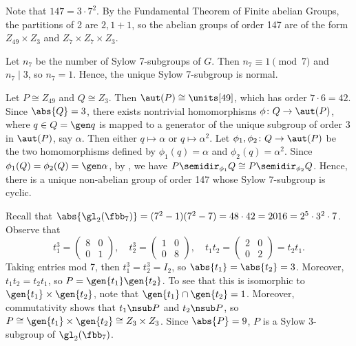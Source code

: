 \begin{solenum}
    \item Note that $147 = 3 \cdot 7^2$.
	By the Fundamental Theorem of Finite abelian Groups, the partitions of 2 are $2, 1 + 1$, so the abelian groups of order 147 are of the form $Z_{49} \times Z_3$ and $Z_7 \times Z_7 \times Z_3$.
    \item Let $n_7$ be the number of Sylow 7-subgroups of $G$.
	Then $n_7 \equiv 1 \pmod 7$ and $n_7 \mid 3$, so $n_7 = 1$.
	Hence, the unique Sylow 7-subgroup is normal.
    \item Let $P \cong Z_{49}$ and $Q \cong Z_3$.
	Then $\aut(P) \cong \units[49]$, which has order $7 \cdot 6 = 42$.
	Since $\abs{Q} = 3$, there exists nontrivial homomorphisms $\phi \colon Q \to \aut(P)$, where $q \in Q = \gen q$ is mapped to a generator of the unique subgroup of order 3 in $\aut(P)$, say $\alpha$.
	Then either $q \mapsto \alpha$ or $q \mapsto \alpha^2$.
	Let $\phi_1, \phi_2 \colon Q \to \aut(P)$ be the two homomorphisms defined by $\phi_1(q) = \alpha$ and $\phi_2(q) = \alpha^2$.
	Since $\phi_1(Q) = \phi_2(Q) = \gen\alpha$, by , we have $P \semidir_{\phi_1} Q \cong P \semidir_{\phi_2} Q$.
	Hence, there is a unique non-abelian group of order 147 whose Sylow 7-subgroup is cyclic.
    \item Recall that $\abs{\gl_2(\fbb_7)} = (7^2 - 1)(7^2 - 7) = 48 \cdot 42 = 2016 = 2^5 \cdot 3^2 \cdot 7$.
	Observe that
    \[
    	t_1^3 = 
        \begin{pmatrix}
            8 & 0 \\
            0 & 1
        \end{pmatrix}, \quad 
        t_2^3 = 
        \begin{pmatrix}
            1 & 0 \\
            0 & 8
        \end{pmatrix}, \quad
        t_1t_2 = 
        \begin{pmatrix}
            2 & 0 \\
            0 & 2
        \end{pmatrix} = t_2t_1.
	\]
    Taking entries mod 7, then $t_1^3 = t_2^3 = I_2$, so $\abs{t_1} = \abs{t_2} = 3$.
	Moreover, $t_1t_2 = t_2t_1$, so $P = \gen{t_1}\gen{t_2}$.
	To see that this is isomorphic to $\gen{t_1} \times \gen{t_2}$, note that $\gen{t_1} \cap \gen{t_2} = 1$.
	Moreover, commutativity shows that ${t_1} \nsub P$ and ${t_2} \nsub P$, so $P \cong \gen{t_1} \times \gen{t_2} \cong Z_3 \times Z_3$.
	Since $\abs{P} = 9$, $P$ is a Sylow 3-subgroup of $\gl_2(\fbb_7)$.


\end{solenum}
